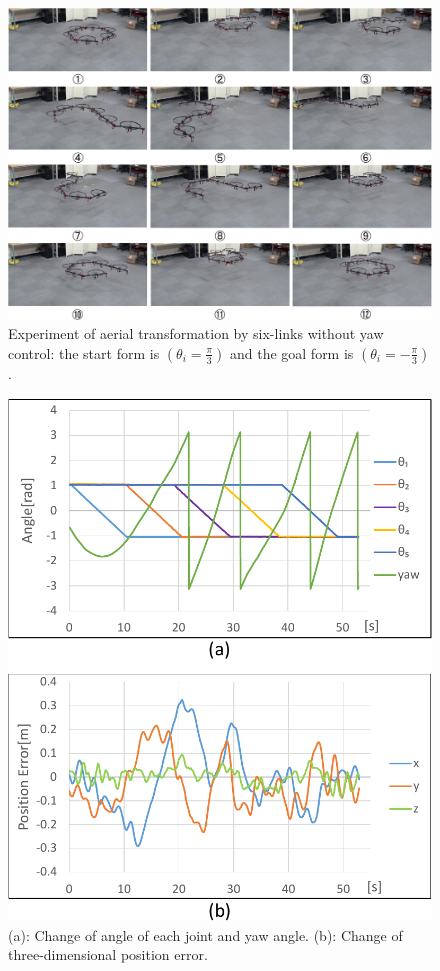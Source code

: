 \begin{figure}[th]
  \begin{center}
    \includegraphics[width=1.0\columnwidth]{figs/hydrus_transformation.pdf}
  \end{center}
  \caption{Experiment of aerial transformation by six-links without yaw control: the start form is $(\theta_i=\frac{\pi}{3})$ and the goal form is $(\theta_i=-\frac{\pi}{3})$.\label{figure:hydrus_transformation}}
\end{figure}

\begin{figure}[th]
  \begin{center}
    \includegraphics[width=0.9\columnwidth]{figs/transform_result.pdf}
  \end{center}
  \caption{(a): Change of angle of each joint and yaw angle. (b): Change of three-dimensional position error. \label{figure:transform_result}}
\end{figure}

